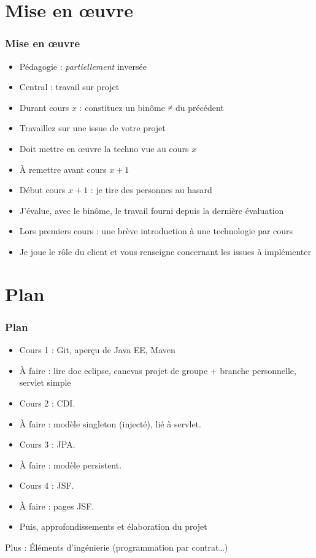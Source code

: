 \documentclass[english, french]{beamer}
\begin{document}
\section{Mise en œuvre}
\begin{frame}
	\frametitle{Mise en œuvre}
	\begin{itemize}
		\item Pédagogie : \emph{partiellement} inversée
		\item Central : travail sur projet
		\item Durant cours $x$ : constituez un binôme ≠ du précédent
		\item Travaillez sur une issue de votre projet
		\item Doit mettre en œuvre la techno vue au cours $x$
		\item À remettre avant cours $x + 1$
		\item Début cours $x + 1$ : je tire des personnes au hasard
		\item J’évalue, avec le binôme, le travail fourni depuis la dernière évaluation
		\item Lors premiers cours : une brève introduction à une technologie par cours
		\item Je joue le rôle du client et vous renseigne concernant les issues à implémenter
	\end{itemize}
\end{frame}

\section{Plan}
\begin{frame}
	\frametitle{Plan}
	
	\begin{itemize}
		\item Cours 1 : Git, aperçu de Java EE, Maven
		\item À faire : lire doc eclipse, canevas projet de groupe + branche personnelle, servlet simple
		\item Cours 2 : CDI.
		\item À faire : modèle singleton (injecté), lié à servlet.
		\item Cours 3 : JPA.
		\item À faire : modèle persistent.
		\item Cours 4 : JSF.
		\item À faire : pages JSF.
		\item Puis, approfondissements et élaboration du projet
	\end{itemize}
	Plus : Éléments d’ingénierie (programmation par contrat…)
\end{frame}
\end{document}
